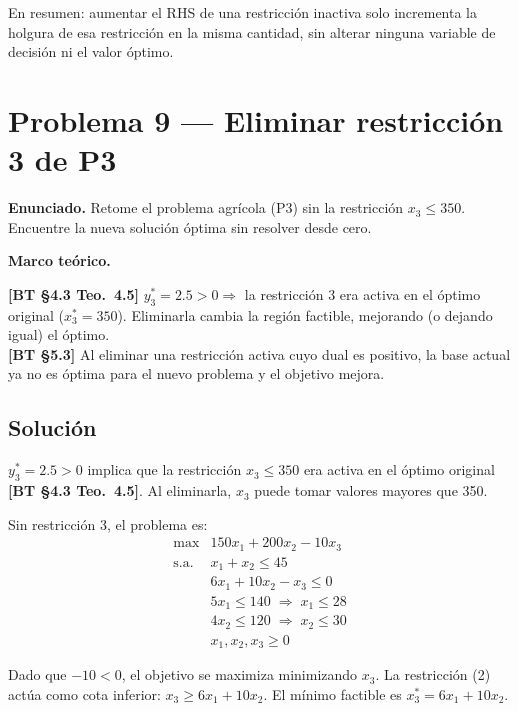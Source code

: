 \documentclass{article}
\newenvironment{marco}{\begin{mdframed}[linecolor=black!40,backgroundcolor=gray!5]\small\textbf{Marco teórico.}\par\smallskip}{\end{mdframed}\medskip}
\begin{document}
En resumen: aumentar el RHS de una restricción inactiva solo incrementa la holgura de esa restricción en la misma cantidad, sin alterar ninguna variable de decisión ni el valor óptimo.

\section*{Problema 9 --- Eliminar restricción 3 de P3}

\textbf{Enunciado.} Retome el problema agrícola (P3) sin la restricción $x_3 \leq 350$. Encuentre la nueva solución óptima sin resolver desde cero.

\begin{marco}
\textbf{[BT §4.3 Teo.\ 4.5]} $y_3^* = 2.5 > 0 \Rightarrow$ la restricción 3 era activa en el óptimo original ($x_3^* = 350$). Eliminarla cambia la región factible, mejorando (o dejando igual) el óptimo. \\[2pt]
\textbf{[BT §5.3]} Al eliminar una restricción activa cuyo dual es positivo, la base actual ya no es óptima para el nuevo problema y el objetivo mejora.
\end{marco}

\subsection*{Solución}

$y_3^* = 2.5 > 0$ implica que la restricción $x_3 \leq 350$ era activa en el óptimo original \textbf{[BT §4.3 Teo.\ 4.5]}. Al eliminarla, $x_3$ puede tomar valores mayores que 350.

Sin restricción 3, el problema es:
\[
\begin{array}{ll}
\max & 150x_1 + 200x_2 - 10x_3 \\
\text{s.a.} & x_1 + x_2 \leq 45 \\
& 6x_1 + 10x_2 - x_3 \leq 0 \\
& 5x_1 \leq 140 \;\Rightarrow\; x_1 \leq 28 \\
& 4x_2 \leq 120 \;\Rightarrow\; x_2 \leq 30 \\
& x_1, x_2, x_3 \geq 0
\end{array}
\]

Dado que $-10 < 0$, el objetivo se maximiza minimizando $x_3$. La restricción (2) actúa como cota inferior: $x_3 \geq 6x_1 + 10x_2$. El mínimo factible es $x_3^* = 6x_1 + 10x_2$.
\end{document}
